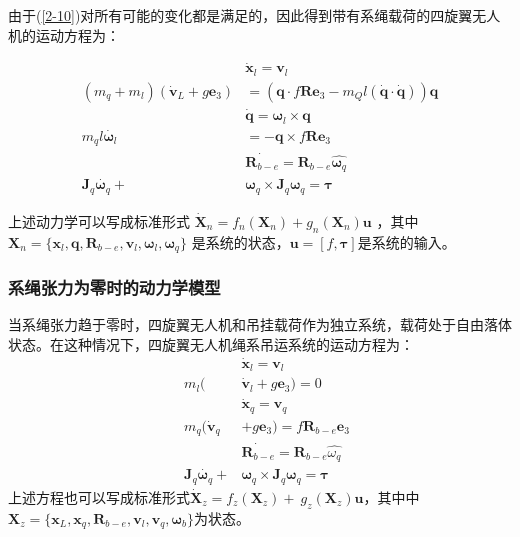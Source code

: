\documentclass[lang=chs, degree=master, blindreview=true, winfonts=true]{yanputhesis}
\begin{document}
由于(\ref{2-10})对所有可能的变化都是满足的，因此得到带有系绳载荷的四旋翼无人机的运动方程为：

\begin{equation}
	\begin{aligned}
		&\dot{\bm x}_{l}=\bm v_{l} \\
		(m_q+m_l)(\dot{\bm v}_L+g\bm e_3)& =(\bm q\cdot f\bm R\bm e_3-m_Ql(\dot{\bm q}\cdot\dot{\bm q}))\bm q \\
		&\dot{\bm q}=\bm \omega_l\times \bm q \\
		m_{q}l \dot{\bm \omega_l}&=-\bm q\times f\bm R\bm e_{3} \\
		&\dot{\bm R_{b-e}}=\bm R_{b-e}\hat{\bm  \omega_q} \\
		\bm J_{q}\dot{\bm  \omega_q}+&\bm  \omega_q\times \bm J_{q}\bm  \omega_q=\bm \tau
	\end{aligned}
\end{equation}

上述动力学可以写成标准形式 $\dot{\bm X}_n= f_n(\bm X_n)+g_n(\bm X_n)\bm u$ ，其中 $\bm X_n = \{\bm x_l,\bm q,\bm R_{b-e},\bm v_l,\bm \omega_l,\bm \omega_q\}$ 是系统的状态，$\bm u = \left[f,\bm \tau \right]$是系统的输入。
\subsubsection{系绳张力为零时的动力学模型}
当系绳张力趋于零时，四旋翼无人机和吊挂载荷作为独立系统，载荷处于自由落体状态。在这种情况下，四旋翼无人机绳系吊运系统的运动方程为：
\begin{equation}
	\begin{aligned}
	&\dot{\bm x}_{l}=\bm v_{l}\\
	\quad m_{l}(&\dot{\bm v}_{l}+g\bm e_{3})=0\\
	&\dot{\bm x}_{q}=\bm v_{q}\\
	\quad m_{q}(\dot{\bm v}_{q}&+g\bm e_{3})=f\bm R_{b-e}\bm e_{3}\\
	&\dot{\bm R_{b-e}}=\bm R_{b-e}\hat{\omega_q}\\
	\quad \bm J_{q}\dot{\bm \omega_q}+&\bm \omega_q \times \bm J_{q}\bm \omega_q=\bm \tau
\end{aligned}
\end{equation}
上述方程也可以写成标准形式$\dot{\bm X}_z=f_z(\bm X_z)+\ g_z(\bm X_z)\bm u$，其中中$\bm X_z = \{\bm x_L,\bm x_q,\bm R_{b-e},\bm v_l,\bm v_q,\bm \omega_b\}$为状态。
\end{document}
